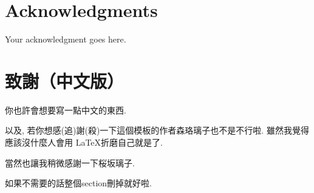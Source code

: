 \section*{\centering Acknowledgments}
\begin{spacing}{2}
    Your acknowledgment goes here.  
    
    \smallskip
    
    
    \newpage
    
    \section*{\centering 致謝（中文版）}
    \smallskip
    
    \par
    你也許會想要寫一點中文的東西.
    
    以及, 若你想感(追)謝(殺)一下這個模板的作者森珞璃子也不是不行啦. 雖然我覺得應該沒什麼人會用 \LaTeX 折磨自己就是了. 
    
    當然也讓我稍微感謝一下桜坂璃子. 
    
    \par
    如果不需要的話整個section刪掉就好啦.
    
    
\end{spacing}